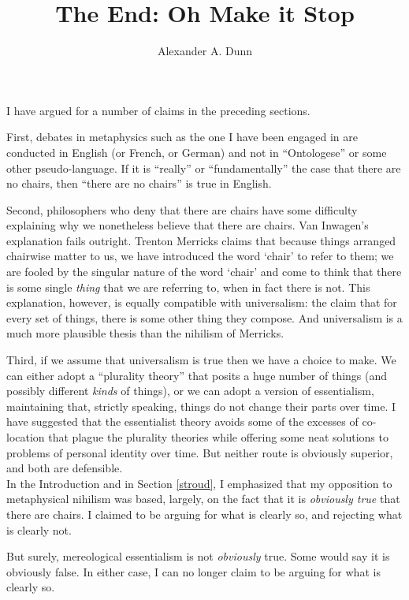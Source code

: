 \documentclass[11pt]{article}
\title{The End: Oh Make it Stop}
\author{Alexander A. Dunn}
\begin{document}
\ifstandalone
\maketitle
\begin{spacing}{1.5}
\fi

I have argued for a number of claims in the preceding sections.

First, debates in metaphysics such as the one I have been engaged in
are conducted in English (or French, or German) and not in
``Ontologese'' or some other pseudo-language.  If it is ``really'' or
``fundamentally'' the case that there are no chairs, then ``there are
no chairs'' is true in English.

Second, philosophers who deny that there are chairs have some
difficulty explaining why we nonetheless believe that there are
chairs.  Van Inwagen's explanation fails outright.  Trenton Merricks
claims that because things arranged chairwise matter to us, we have
introduced the word `chair' to refer to them; we are fooled by the
singular nature of the word `chair' and come to think that there is
some single {\em thing} that we are referring to, when in fact there
is not.  This explanation, however, is equally compatible with
universalism: the claim that for every set of things, there is some
other thing they compose.  And universalism is a much more plausible
thesis than the nihilism of Merricks.

Third, if we assume that universalism is true then we have a choice to
make.  We can either adopt a ``plurality theory'' that posits a huge
number of things (and possibly different {\em kinds} of things), or we
can adopt a version of essentialism, maintaining that, strictly
speaking, things do not change their parts over time.  I have
suggested that the essentialist theory avoids some of the excesses of
co-location that plague the plurality theories while offering some
neat solutions to problems of personal identity over time.  But
neither route is obviously superior, and both are defensible.\\

In the Introduction and in Section \ref{stroud}, I emphasized that my
opposition to metaphysical nihilism was based, largely, on the fact
that it is {\em obviously true} that there are chairs.  I claimed to
be arguing for what is clearly so, and rejecting what is clearly not.

But surely, mereological essentialism is not {\em obviously} true.
Some would say it is obviously false.  In either case, I can no longer
claim to be arguing for what is clearly so.


\end{spacing}
\end{document}
